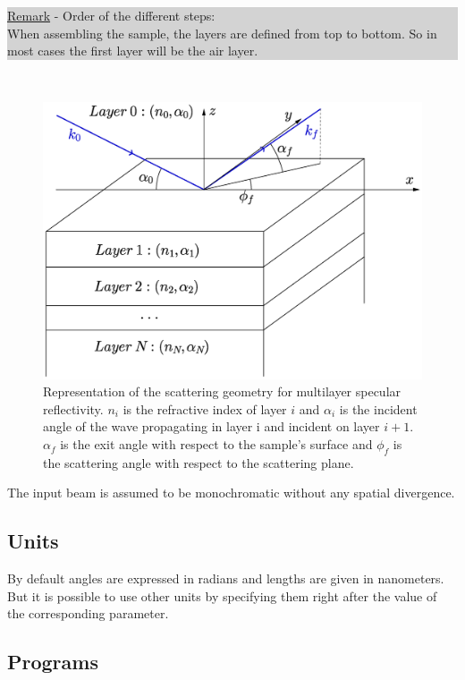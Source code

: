 \noindent {\huge\danger} 
\colorbox{Lightgray}{\parbox{\dimexpr\linewidth-8\fboxsep}
{\underline{Remark} - Order of the different steps: \\
When assembling the sample, the layers are defined from top to
bottom. So in most cases the first layer will be the air layer.}}\\

\begin{figure}[h]
  \centering
    \includegraphics[trim=20mm 70mm 150mm 60mm, clip=true, width=120mm]{multilayer3d.eps}
  \caption[Representation of the scattering geometry for multilayer
    specular reflectivity.]{Representation of the scattering geometry for multilayer
    specular reflectivity. $n_i$ is
    the refractive index of layer $i$ and $\alpha_i$ is the incident
    angle of the wave propagating in layer i and incident on layer $i+1$. $\alpha_f$ is the exit angle with respect to the sample's surface and
$\phi_f$ is the scattering angle with respect to the scattering plane.}
  \label{fig:multil3d}
\end{figure}

\noindent The input beam is assumed to be monochromatic without any
spatial divergence.

\subsection{Units}
By default angles are expressed in radians and lengths are given in
nanometers.  But it is possible to use other units by
  specifying them right after the value of the corresponding parameter.

\subsection{Programs}

